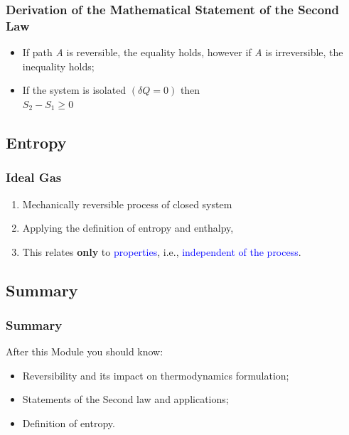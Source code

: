 \documentclass[10pt,compress]{beamer}
\begin{document}
\begin{frame}
 \frametitle{Derivation of the Mathematical Statement of the Second Law}
   \begin{itemize}
  \item <1-> If path {\it A} is reversible, the equality holds, however if {\it A} is irreversible, the inequality holds;
  \item <2-> If the system is isolated $\left(\delta Q = 0\right)$ then\\
    $S_{2}-S_{1}\geq 0$
   \end{itemize}
 \normalsize
    
\end{frame}


\subsection{Entropy} 

\begin{frame}
 \frametitle{Ideal Gas}
   \begin{enumerate}
     \item<1-> Mechanically reversible process of closed system
     \item<2-> Applying the definition of entropy and enthalpy,
     \item<2-> This relates {\bf only} to \textcolor{blue}{properties}, i.e., \textcolor{blue}{independent of the process}.
   \end{enumerate}
 \normalsize
\end{frame}


\subsection{Summary}
\begin{frame}
 \frametitle{Summary}
After this Module you should know: 
 \begin{itemize}
  \item <1-> Reversibility and its impact on thermodynamics formulation;
  \item <2-> Statements of the Second law and applications;
  \item <3-> Definition of entropy.
 \end{itemize}
\end{frame}
\end{document}
